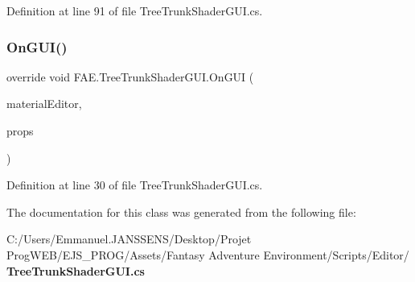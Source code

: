Definition at line 91 of file Tree\+Trunk\+Shader\+G\+U\+I.\+cs.

\mbox{\label{class_f_a_e_1_1_tree_trunk_shader_g_u_i_aa2043ee77059503b486d8614051381cd}} 
\subsubsection{On\+G\+U\+I()}
{\footnotesize\ttfamily override void F\+A\+E.\+Tree\+Trunk\+Shader\+G\+U\+I.\+On\+G\+UI (\begin{DoxyParamCaption}\item[{Material\+Editor}]{material\+Editor,  }\item[{Material\+Property [$\,$]}]{props }\end{DoxyParamCaption})}



Definition at line 30 of file Tree\+Trunk\+Shader\+G\+U\+I.\+cs.



The documentation for this class was generated from the following file\+:\begin{DoxyCompactItemize}
\item 
C\+:/\+Users/\+Emmanuel.\+J\+A\+N\+S\+S\+E\+N\+S/\+Desktop/\+Projet Prog\+W\+E\+B/\+E\+J\+S\+\_\+\+P\+R\+O\+G/\+Assets/\+Fantasy Adventure Environment/\+Scripts/\+Editor/\textbf{ Tree\+Trunk\+Shader\+G\+U\+I.\+cs}\end{DoxyCompactItemize}
